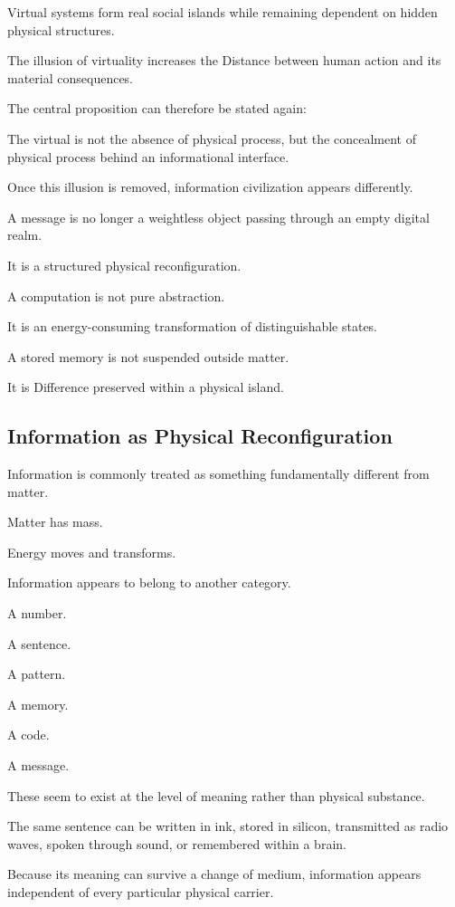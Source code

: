 Virtual systems form real social islands while remaining dependent on hidden physical structures.

The illusion of virtuality increases the Distance between human action and its material consequences.

The central proposition can therefore be stated again:

The virtual is not the absence of physical process, but the concealment of physical process behind an informational interface.

Once this illusion is removed, information civilization appears differently.

A message is no longer a weightless object passing through an empty digital realm.

It is a structured physical reconfiguration.

A computation is not pure abstraction.

It is an energy-consuming transformation of distinguishable states.

A stored memory is not suspended outside matter.

It is Difference preserved within a physical island.

\subsection*{\textbf{Information as Physical Reconfiguration}} 

Information is commonly treated as something fundamentally different from matter.

Matter has mass.

Energy moves and transforms.

Information appears to belong to another category.

A number.

A sentence.

A pattern.

A memory.

A code.

A message.

These seem to exist at the level of meaning rather than physical substance.

The same sentence can be written in ink, stored in silicon, transmitted as radio waves, spoken through sound, or remembered within a brain.

Because its meaning can survive a change of medium, information appears independent of every particular physical carrier.

